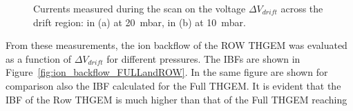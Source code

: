 \documentclass[a4paper, 11 pt]{report}
\newcommand{\Vdrift}{$ \Delta V_{drift}$}
\begin{document}
\begin{figure}[!htb]
	\centering
	\caption{Currents measured during the scan on the voltage \Vdrift{} across the drift region: in 
	(a) at 20~mbar, in (b) at 10~mbar.}
	\label{fig:drift_ROWTHGEM_20and10_mbar}
\end{figure}
From these measurements, the ion backflow of the ROW THGEM was evaluated as a function of \Vdrift{} 
for different pressures. The IBFs are shown in Figure~\ref{fig:ion_backflow_FULLandROW}.
In the same figure are shown for comparison also the IBF calculated for the Full THGEM.
It is evident that the IBF of the Row THGEM is much higher than that of the Full THGEM reaching 
\end{document}
